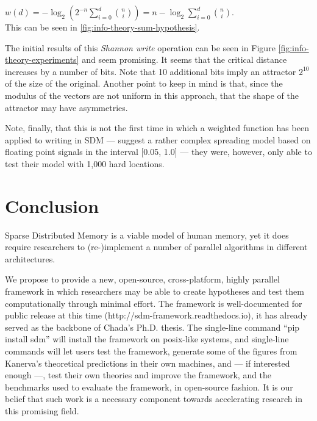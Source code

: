 $w(d) = -\log_2 \left( 2^{-n} \displaystyle\sum_{i=0}^{d}{\binom{n}{i}} \right) = n - \log_2 \displaystyle\sum_{i=0}^{d}{\binom{n}{i}}$. \\

This can be seen in \ref{fig:info-theory-sum-hypothesis}.

The initial results of this \emph{Shannon write} operation can be seen in Figure \ref{fig:info-theory-experiments} and seem promising. It seems that the critical distance increases by a number of bits.  Note that 10 additional bits imply an attractor $2^{10}$ of the size of the original. Another point to keep in mind is that, since the modulus of the vectors are not uniform in this approach, that the shape of the attractor may have asymmetries.



Note, finally, that this is not the first time in which a weighted function has been applied to writing in SDM --- \citet{hely1997new} suggest a rather complex spreading model based on floating point signals in the interval [0.05, 1.0] --- they were, however, only able to test their model with 1,000 hard locations.








\chapter{Conclusion}

Sparse Distributed Memory is a viable model of human memory, yet it does require researchers to (re-)implement a number of parallel algorithms in different architectures.

We propose to provide a new, open-source, cross-platform, highly parallel framework in which researchers may be able to create hypotheses and test them computationally through minimal effort. The framework is well-documented for public release at this time (http://sdm-framework.readthedocs.io), it has already served as the backbone of Chada's Ph.D. thesis. The single-line command ``pip install sdm'' will install the framework on posix-like systems, and single-line commands will let users test the framework, generate some of the figures from Kanerva's theoretical predictions in their own machines, and --- if interested enough ---, test their own theories and improve the framework, and the benchmarks used to evaluate the framework, in open-source fashion. It is our belief that such work is a necessary component towards accelerating research in this promising field.

